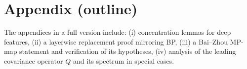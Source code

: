 \documentclass[anon]{colt2026}
\begin{document}
\section{Appendix (outline)}
The appendices in a full version include:
(i) concentration lemmas for deep features,
(ii) a layerwise replacement proof mirroring BP,
(iii) a Bai--Zhou MP-map statement and verification of its hypotheses,
(iv) analysis of the leading covariance operator $Q$ and its spectrum in special cases.


\end{document}
